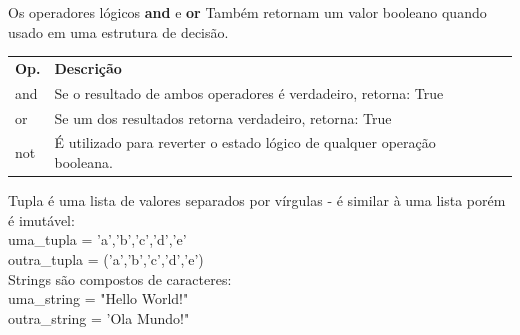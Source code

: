 \documentclass[landscape,a0paper,fontscale=0.285]{baposter} %
\begin{document}
\begin{poster}
{						%
						\colorbox[HTML]{CCFFFF}{}
						Os operadores lógicos {\bf and} e {\bf or} Também retornam um valor booleano quando usado em uma estrutura de decisão.\\
						\begin{tabular}{lp{6.5cm}lp{1.0cm}|}
							{\bf Op.} & {\bf Descrição}\\
							and & Se o resultado de ambos operadores é verdadeiro, retorna: True \\
							or & Se um dos resultados retorna verdadeiro, retorna: True \\
							not & É utilizado para reverter o estado lógico de qualquer operação booleana.
						\end{tabular}
						
						\colorbox[HTML]{CCFFFF}{}
						Tupla é uma lista de valores separados por vírgulas - é similar à uma lista porém é imutável: \\ 
						uma\_tupla = 'a','b','c','d','e' \\
						outra\_tupla = ('a','b','c','d','e') \\
						
						\colorbox[HTML]{CCFFFF}{}
						Strings são compostos de caracteres: \\ 
						uma\_string = "Hello World!" \\
						outra\_string = 'Ola Mundo!"
						
					}
					

\end{poster}
\end{document}
